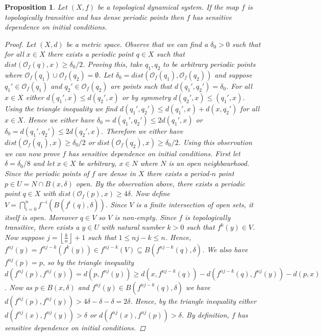 \documentclass[11pt,a4paper,oneside]{memoir}
\theoremstyle{plain}
\newtheorem{prop}[thm]{Proposition}
\theoremstyle{definition}
\begin{document}
\begin{prop} \label{prop:transitivity-dense-periodic-implies-sdic}
    Let $(X, f)$ be a topological dynamical system. If the map $f$ is topologically transitive and has dense periodic points then $f$ has sensitive dependence on initial conditions.
    \begin{proof}
        Let $(X, d)$ be a metric space. Observe that we can find a $\delta_0 > 0$ such that for all $x \in X$ there exists a periodic point $q \in X$ such that $dist(\mathcal{O}_f(q), x) \geq \delta_0/2$. Proving this, take $q_1, q_2$ to be arbitrary periodic points where $\mathcal{O}_f(q_1) \cup \mathcal{O}_f(q_2) = \emptyset$. Let $\delta_0 = dist(\mathcal{O}_f(q_1), \mathcal{O}_f(q_2))$ and suppose $q_1' \in \mathcal{O}_f(q_1)$ and  $q_2' \in \mathcal{O}_f(q_2)$ are points such that $d(q_1', q_2') = \delta_0$. For all $x \in X$ either $d(q_1', x) \leq d(q_2', x)$ or by symmetry $d(q_2', x) \leq (q_1', x)$. Using the triangle inequality we find $d(q_1', q_2') \leq d(q_1', x) + d(x, q_2')$ for all $x \in X$. Hence we either have $\delta_0 = d(q_1', q_2') \leq 2d(q_1', x)$ or $\delta_0 = d(q_1', q_2') \leq 2d(q_2', x)$. Therefore we either have $dist(\mathcal{O}_f(q_1), x) \geq \delta_0/2$ or $dist(\mathcal{O}_f(q_2), x) \geq \delta_0/2$. Using this observation we can now prove $f$ has sensitive dependence on initial conditions. First let $\delta = \delta_0/8$ and let $x \in X$ be arbitrary, $x \in N$ where $N$ is an open neighbourhood. Since the periodic points of $f$ are dense in $X$ there exists a period-$n$ point $p \in U = N \cap B(x, \delta)$ open. By the observation above, there exists a periodic point $q \in X$ with $dist(\mathcal{O}_f(p), x) \geq 4\delta$. Now define $V = \bigcap_{i=0}^n f^{-i}(B(f^i(q), \delta))$. Since $V$ is a finite intersection of open sets, it itself is open. Moreover $q \in V$ so $V$ is non-empty. Since $f$ is topologically transitive, there exists a $y \in U$ with natural number $k > 0$ such that $f^k(y) \in V$. Now suppose $j = \left\lfloor \frac{k}{n} \right\rfloor + 1$ such that $1 \leq nj - k \leq n$. Hence, $f^{nj}(y) = f^{nj - k}(f^k(y)) \in f^{nj - k}(V) \subseteq B(f^{nj - k}(q), \delta)$. We also have $f^{nj}(p) = p$, so by the triangle inequality $d(f^{nj}(p), f^{nj}(y)) = d(p, f^{nj}(y)) \geq d(x, f^{nj - k}(q)) - d(f^{nj - k}(q), f^{nj}(y)) - d(p, x)$. Now as $p \in B(x, \delta)$ and $f^{nj}(y) \in B(f^{nj - k}(q), \delta)$ we have $d(f^{nj}(p), f^{nj}(y)) > 4\delta - \delta - \delta = 2\delta$. Hence, by the triangle inequality either $d(f^{nj}(x), f^{nj}(y)) > \delta$ or $d(f^{nj}(x), f^{nj}(p)) > \delta$. By definition, $f$ has sensitive dependence on initial conditions.
    \end{proof}
\end{prop}
\end{document}
